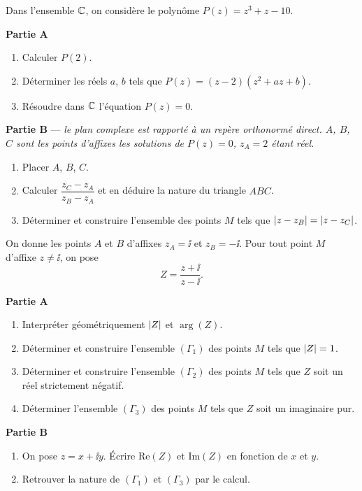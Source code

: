 Dans l'ensemble $\mathbb{C}$, on considère le polynôme $P(z) = z^3 + z - 10$.

\textbf{Partie A}
\begin{enumerate}
	\item Calculer $P(2)$.
	\item Déterminer les réels $a$, $b$ tels que
	$P(z) = (z - 2)(z^2 + az + b)$.
	\item Résoudre dans $\mathbb{C}$ l'équation $P(z) = 0$.
\end{enumerate}

\textbf{Partie B} — \textit{le plan complexe est rapporté à un repère
orthonormé direct. $A$, $B$, $C$ sont les points d'affixes les solutions de
$P(z) = 0$, $z_A = 2$ étant réel.}
\begin{enumerate}
	\item Placer $A$, $B$, $C$.
	\item Calculer $\dfrac{z_C - z_A}{z_B - z_A}$ et en déduire la nature du
	triangle $ABC$.
	\item Déterminer et construire l'ensemble des points $M$ tels que
	$\left|z - z_B\right| = \left|z - z_C\right|$.
\end{enumerate}

On donne les points $A$ et $B$ d'affixes $z_A = \ii$ et $z_B = -\ii$. Pour tout
point $M$ d'affixe $z \neq \ii$, on pose
$$
Z = \frac{z + \ii}{z - \ii}.
$$

\textbf{Partie A}
\begin{enumerate}
	\item Interpréter géométriquement $\left|Z\right|$ et $\arg(Z)$.
	\item Déterminer et construire l'ensemble $(\Gamma_1)$ des points $M$ tels
	que $\left|Z\right| = 1$.
	\item Déterminer et construire l'ensemble $(\Gamma_2)$ des points $M$ tels
	que $Z$ soit un réel strictement négatif.
	\item Déterminer l'ensemble $(\Gamma_3)$ des points $M$ tels que $Z$ soit
	un imaginaire pur.
\end{enumerate}

\textbf{Partie B}
\begin{enumerate}
	\item On pose $z = x + \ii y$. Écrire $\mathrm{Re}(Z)$ et $\mathrm{Im}(Z)$
	en fonction de $x$ et $y$.
	\item Retrouver la nature de $(\Gamma_1)$ et $(\Gamma_3)$ par le calcul.
\end{enumerate}

